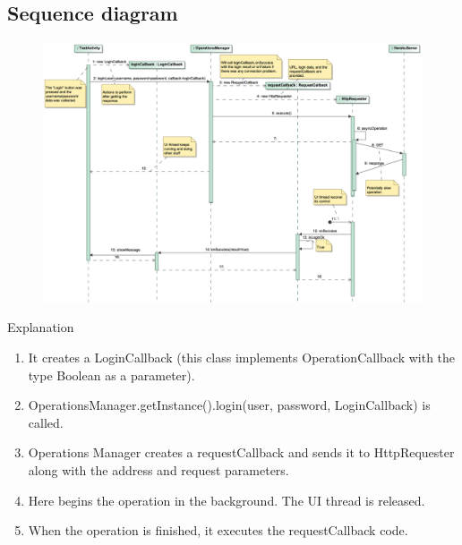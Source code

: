 \documentclass{beamer}
\begin{document}
\subsection{Sequence diagram}
\begin{frame}
\begin{figure}
\begin{center}
\includegraphics[scale=0.31]{../observer-pattern/diagrams/login}
\end{center}
\end{figure}
\end{frame}

\begin{frame}{Explanation}
\begin{enumerate}
\item It creates a LoginCallback (this class implements OperationCallback with the type Boolean as a parameter).
\item OperationsManager.getInstance().login(user, password, LoginCallback) is called.
\item Operations Manager creates a requestCallback and sends it to HttpRequester along with the address and request parameters.
\item Here begins the operation in the background. The UI thread is released.
\item When the operation is finished, it executes the requestCallback code.
\end{enumerate} 
\end{frame}
\end{document}
